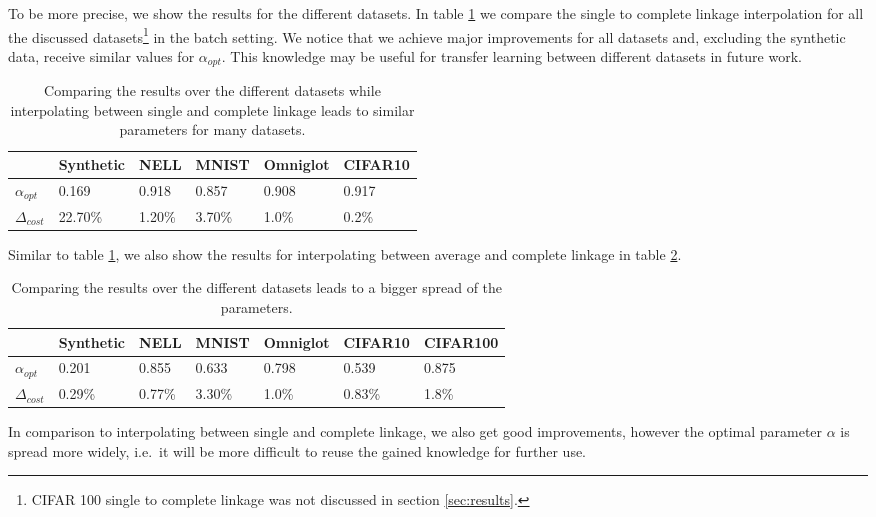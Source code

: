 To be more precise, we show the results for the different datasets. In table \ref{table:comparison} we compare the single to complete linkage interpolation for all the discussed datasets\footnote{CIFAR 100 single to complete linkage was not discussed in section \ref{sec:results}.} in the batch setting. We notice that we achieve major improvements for all datasets and, excluding the synthetic data, receive similar values for $\alpha_{opt}$. This knowledge may be useful for transfer learning between different datasets in future work.

\begin{table}[H]
    \centering
    \begin{tabular}{|l | l | l | l | l | l |}
    \hline
    & Synthetic & NELL & MNIST & Omniglot & CIFAR10\\ \hline
    $\alpha_{opt}$ & 0.169 & 0.918 & 0.857 & 0.908 & 0.917\\
    $\Delta_{cost}$ & 22.70\% & 1.20\% & 3.70\% & 1.0\% & 0.2\%\\\hline
    \end{tabular}
    \caption{Comparing the results over the different datasets while interpolating between single and complete linkage leads to similar parameters for many datasets.}
    \label{table:comparison}
\end{table}

Similar to table \ref{table:comparison}, we also show the results for interpolating between average and complete linkage in table \ref{table:comparison_ac}.

\begin{table}[H]
    \centering
    \begin{tabular}{|l | l | l | l | l | l | l |}
    \hline
    & Synthetic & NELL & MNIST & Omniglot & CIFAR10 & CIFAR100\\ \hline
    $\alpha_{opt}$ & 0.201 & 0.855 & 0.633 & 0.798 & 0.539 & 0.875\\
    $\Delta_{cost}$ & 0.29\% & 0.77\% & 3.30\% & 1.0\% & 0.83\% & 1.8\%\\\hline
    \end{tabular}
    \caption{Comparing the results over the different datasets leads to a bigger spread of the parameters.}
    \label{table:comparison_ac}
\end{table}

In comparison to interpolating between single and complete linkage, we also get good improvements, however the optimal parameter $\alpha$ is spread more widely, i.e.\ it will be more difficult to reuse the gained knowledge for further use.\\

